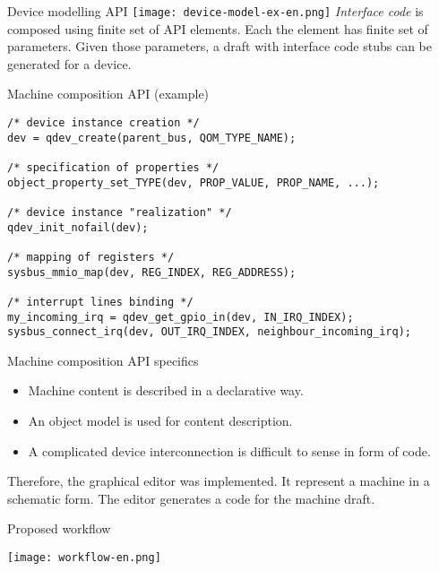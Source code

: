 \documentclass[unicode,hyperref={unicode=true},aspectratio=169]{beamer}
\begin{document}
\begin{frame}{Device modelling API}
\texttt{[image: device-model-ex-en.png]}
\vfill
\textit{Interface code} is composed using finite set of API elements. Each the
element has finite set of parameters. Given those parameters, a draft with
interface code stubs can be generated for a device.
\end{frame}



\begin{frame}[fragile]{Machine composition API (example)}
\lstset{language=C}
\begin{lstlisting}
/* device instance creation */
dev = qdev_create(parent_bus, QOM_TYPE_NAME);

/* specification of properties */
object_property_set_TYPE(dev, PROP_VALUE, PROP_NAME, ...);

/* device instance "realization" */
qdev_init_nofail(dev);

/* mapping of registers */
sysbus_mmio_map(dev, REG_INDEX, REG_ADDRESS);

/* interrupt lines binding */
my_incoming_irq = qdev_get_gpio_in(dev, IN_IRQ_INDEX);
sysbus_connect_irq(dev, OUT_IRQ_INDEX, neighbour_incoming_irq);
\end{lstlisting}
\end{frame}



\begin{frame}{Machine composition API specifics}

\begin{itemize}
\item Machine content is described in a declarative way.
\item An object model is used for content description.
\item A complicated device interconnection is difficult to sense in form of
code.
\end{itemize}

\begin{center}
Therefore, the graphical editor was implemented. It represent a machine in
a schematic form. The editor generates a code for the machine draft.
\end{center}

\end{frame}



\begin{frame}{Proposed workflow}
\begin{center}
\texttt{[image: workflow-en.png]}
\end{center}
\end{frame}
\end{document}
